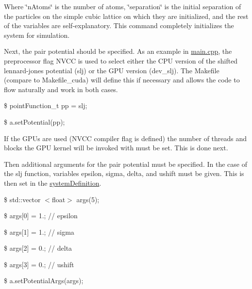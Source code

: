 \begin{DoxyEnumerate}
\item Where \char`\"{}n\-Atoms\char`\"{} is the number of atoms, \char`\"{}separation\char`\"{} is the initial separation of the particles on the simple cubic lattice on which they are initialized, and the rest of the variables are self-\/explanatory. This command completely initializes the system for simulation.
\end{DoxyEnumerate}


\begin{DoxyEnumerate}
\item Next, the pair potential should be specified. As an example in \hyperlink{main_8cpp_source}{main.\-cpp}, the preprocessor flag N\-V\-C\-C is used to select either the C\-P\-U version of the shifted lennard-\/jones potential (slj) or the G\-P\-U version (dev\-\_\-slj). The Makefile (compare to Makefile\-\_\-cuda) will define this if necessary and allows the code to flow naturally and work in both cases.

\$ point\-Function\-\_\-t pp = slj;

\$ a.\-set\-Potential(pp);
\end{DoxyEnumerate}


\begin{DoxyEnumerate}
\item If the G\-P\-Us are used (N\-V\-C\-C compiler flag is defined) the number of threads and blocks the G\-P\-U kernel will be invoked with must be set. This is done next.
\end{DoxyEnumerate}


\begin{DoxyEnumerate}
\item Then additional arguments for the pair potential must be specified. In the case of the slj function, variables epsilon, sigma, delta, and ushift must be given. This is then set in the \hyperlink{classsystem_definition}{system\-Definition}.

\$ std\-::vector $<$float$>$ args(5);

\$ args\mbox{[}0\mbox{]} = 1.; // epsilon

\$ args\mbox{[}1\mbox{]} = 1.; // sigma

\$ args\mbox{[}2\mbox{]} = 0.; // delta

\$ args\mbox{[}3\mbox{]} = 0.; // ushift

\$ a.\-set\-Potential\-Args(args);
\end{DoxyEnumerate}


